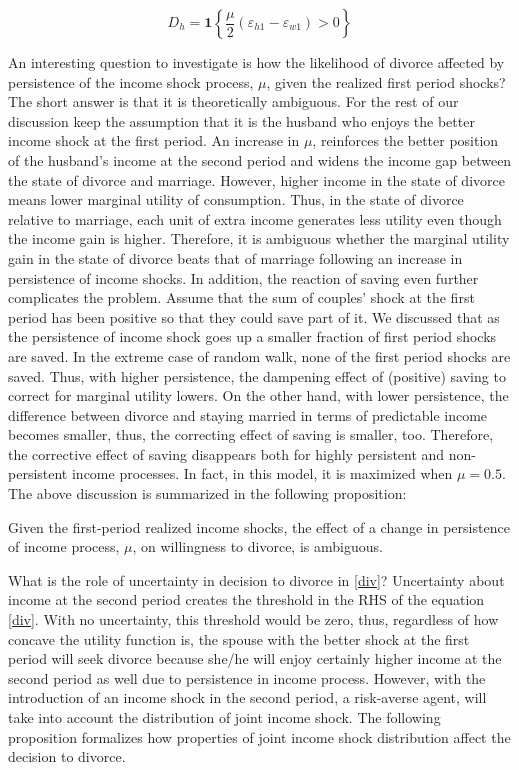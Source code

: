 \begin{equation*}
D_h = \mathbf 1 \left \{ \dfrac{\mu}{2} (\varepsilon_{h1} - \varepsilon_{w1}) > 0\right\}
\end{equation*}

An interesting question to investigate is how the likelihood of divorce affected by persistence of the income shock process, $\mu$, given the realized first period shocks? The short answer is that it is theoretically ambiguous. For the rest of our discussion keep the assumption that it is the husband who enjoys the better income shock at the first period. An increase in $\mu$, reinforces the better position of the husband's income at the second period and widens the income gap between the state of divorce and marriage. However, higher income in the state of divorce means lower marginal utility of consumption. Thus, in the state of divorce relative to marriage, each unit of extra income generates less utility even though the income gain is higher. Therefore, it is ambiguous whether the marginal utility gain in the state of divorce beats that of marriage following an increase in persistence of income shocks. In addition, the reaction of saving even further complicates the problem. Assume that the sum of couples' shock at the first period has been positive so that they could save part of it. We discussed that as the persistence of income shock goes up a smaller fraction of first period shocks are saved. In the extreme case of random walk, none of the first period shocks are saved. Thus, with higher persistence, the dampening effect of (positive) saving to correct for marginal utility lowers. On the other hand, with lower persistence, the difference between divorce and staying married in terms of predictable income becomes smaller, thus, the correcting effect of saving is smaller, too. Therefore, the corrective effect of saving disappears both for highly persistent and non-persistent income processes. In fact, in this model, it is maximized when $\mu = 0.5$. The above discussion is summarized in the following proposition:

\begin{prop}
Given the first-period realized income shocks, the effect of a change in persistence of income process, $\mu$, on willingness to divorce, is ambiguous.
\end{prop}

 
What is the role of uncertainty in decision to divorce in \eqref{div}? Uncertainty about income at the second period creates the threshold in the RHS of the equation \eqref{div}. With no uncertainty, this threshold would be zero, thus, regardless of how concave the utility function is, the spouse with the better shock at the first period will seek divorce because she/he  will enjoy certainly higher income at the second period as well due to persistence in income process.  However, with the introduction of an income shock in the second period, a risk-averse agent, will take into account the distribution of joint income shock. The following proposition formalizes how properties of joint income shock distribution affect the decision to divorce. 

